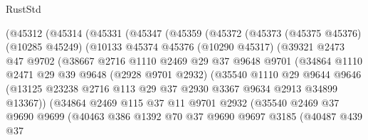 \begin{lexlean}{RustStd}
\begin{coremodule}
        (@45312
          (@45314
            (@45331
              (@45347
                (@45359
                  (@45372
                    (@45373
                      (@45375 @45376)
                      (@10285 @45249)
                      (@10133
                        @45374
                        @45376
                        (@10290 @45317)
                        (@39321
                          @2473
                          @47
                          @9702
                          (@38667
                            @2716
                            @1110
                            @2469
                            @29
                            @37
                            @9648
                            @9701
                            (@34864
                              @1110
                              @2471
                              @29
                              @39
                              @9648
                              (@2928 @9701 @2932)
                              (@35540
                                @1110
                                @29
                                @9644
                                @9646
                                (@13125
                                  @23238
                                  @2716
                                  @113
                                  @29
                                  @37
                                  @2930
                                  @3367
                                  @9634
                                  @2913
                                  @34899
                                  @13367))
                              (@34864
                                @2469
                                @115
                                @37
                                @11
                                @9701
                                @2932
                                (@35540
                                  @2469
                                  @37
                                  @9690
                                  @9699
                                  (@40463
                                    @386
                                    @1392
                                    @70
                                    @37
                                    @9690
                                    @9697
                                    @3185
                                    (@40487
                                      @439
                                      @37

\end{coremodule}
\end{lexlean}
